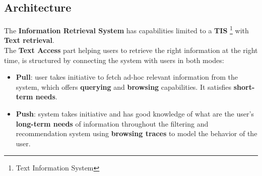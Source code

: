 \documentclass[12pt]{spieman}  %
\begin{document}
\begin{spacing}{1}
    \section{Architecture}\label{sec:architecture}

    The \textbf{Information Retrieval System} has capabilities limited to a
    \textbf{TIS} \footnote{Text Information System}
    with \textbf{Text retrieval}.\\
    The \textbf{Text Access} part helping users to retrieve the right information at the right time,
    is structured by connecting the system with users in both modes:
    \begin{itemize}
        \item \textbf{Pull}: user takes initiative to fetch ad-hoc relevant information from the system,
              which offers \textbf{querying} and \textbf{browsing} capabilities.
              It satisfies \textbf{short-term needs}.
        \item \textbf{Push}: system takes initiative and has good knowledge of what are the user's
              \textbf{long-term needs} of information throughout the filtering and recommendation system
              using \textbf{browsing traces} to model the behavior of the user.
    \end{itemize}


\end{spacing}
\end{document}

